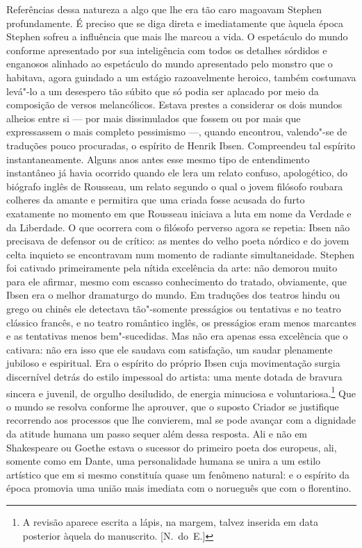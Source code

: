 Referências dessa natureza a algo que lhe era tão caro magoavam
Stephen profundamente.  É preciso que se diga direta e imediatamente
que àquela época Stephen sofreu a influência que mais lhe marcou a
vida.  O espetáculo do mundo conforme apresentado por sua inteligência
com todos os detalhes sórdidos e enganosos alinhado ao espetáculo do
mundo apresentado pelo monstro que o habitava, agora guindado a um
estágio razoavelmente heroico, também costumava levá"-lo a um desespero
tão súbito que só podia ser aplacado por meio da composição de versos
melancólicos.  Estava prestes a considerar os dois mundos alheios entre
si --- por mais dissimulados que fossem ou por mais que expressassem o
mais completo pessimismo ---, quando encontrou, valendo"-se de
traduções pouco procuradas, o espírito de Henrik Ibsen.  Compreendeu		
tal espírito \label{instantaneamente} instantaneamente.  Alguns anos antes esse mesmo tipo de
entendimento instantâneo já havia ocorrido quando ele lera um relato
confuso, apologético, do biógrafo inglês de Rousseau, um relato segundo		
o qual o \label{jovem"-filosofo} jovem filósofo roubara colheres da amante e permitira que
uma criada fosse acusada do furto exatamente no momento em que Rousseau
iniciava a luta em nome da Verdade e da Liberdade.  O que ocorrera com
o filósofo perverso agora se repetia: Ibsen não precisava
de defensor ou de crítico: as mentes do velho poeta nórdico e do jovem
celta inquieto se encontravam num momento de radiante simultaneidade.
Stephen foi cativado primeiramente pela nítida excelência da arte: não
demorou muito para ele afirmar, mesmo com escasso conhecimento do
tratado, obviamente, que Ibsen era o melhor dramaturgo do mundo.  Em
traduções dos teatros hindu ou grego ou chinês ele detectava
tão"-somente presságios ou tentativas e no teatro clássico francês, e no
teatro romântico inglês, os presságios eram menos marcantes e as
tentativas menos bem"-sucedidas.  Mas não era apenas essa excelência que
o cativara: não era isso que ele saudava com satisfação, um saudar
plenamente jubiloso e espiritual.  Era o espírito do próprio Ibsen cuja
movimentação surgia discernível detrás do estilo impessoal do
artista:
uma mente dotada de bravura sincera e juvenil, de orgulho desiludido, de energia
minuciosa e voluntariosa.\footnote{ A revisão aparece escrita a lápis,
na margem, talvez inserida em data posterior àquela do manuscrito. [N.~do~E.]}  
Que o mundo se resolva conforme lhe aprouver, que o suposto
Criador se justifique recorrendo aos processos que lhe convierem, mal
se pode avançar com a dignidade da atitude humana um passo sequer além
dessa resposta.  Ali e não em Shakespeare ou Goethe estava o sucessor
do primeiro poeta dos europeus, ali, somente como em Dante, uma
personalidade humana se unira a um estilo artístico que em si mesmo
constituía quase um fenômeno natural: e o espírito da época promovia
uma união mais imediata com o norueguês que com o florentino.

